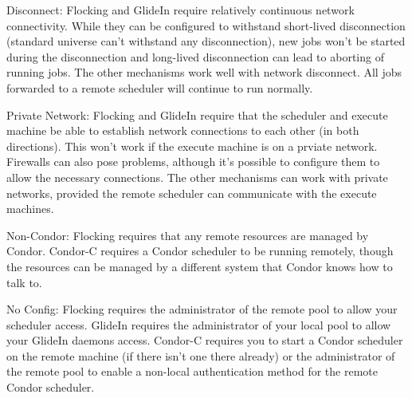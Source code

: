 Disconnect: Flocking and GlideIn require relatively continuous network
connectivity. While they can be configured to withstand short-lived
disconnection (standard universe can't withstand any disconnection),
new jobs won't be started during the disconnection and long-lived
disconnection can lead to aborting of running jobs. The other mechanisms
work well with network disconnect. All jobs forwarded to a remote
scheduler will continue to run normally.

Private Network: Flocking and GlideIn require that the scheduler and
execute machine be able to establish network connections to each other
(in both directions). This won't work if the execute machine is on a
prviate network. Firewalls can also pose problems, although it's possible
to configure them to allow the necessary connections. The other 
mechanisms can work with private networks, provided the remote scheduler
can communicate with the execute machines.

Non-Condor: Flocking requires that any remote resources are managed by
Condor. Condor-C requires a Condor scheduler to be running remotely,
though the resources can be managed by a different system that Condor
knows how to talk to.

No Config: Flocking requires the administrator of the remote pool to 
allow your scheduler access. GlideIn requires the administrator of your
local pool to allow your GlideIn daemons access. Condor-C requires you
to start a Condor scheduler on the remote machine (if there isn't one
there already) or the administrator of the remote pool to enable a
non-local authentication method for the remote Condor scheduler.

